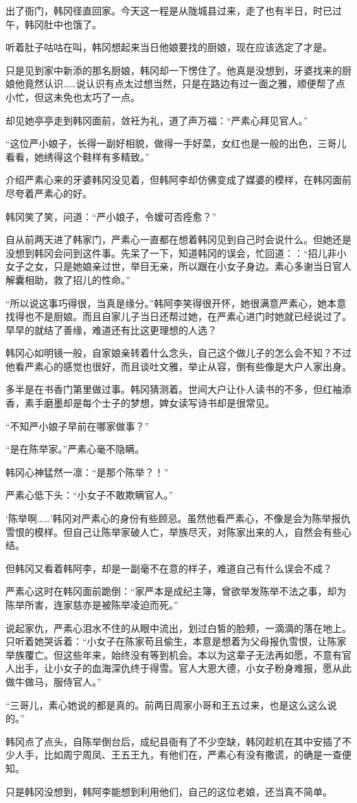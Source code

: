 出了衙门，韩冈径直回家。今天这一程是从陇城县过来，走了也有半日，时已过午，韩冈肚中也饿了。

听着肚子咕咕在叫，韩冈想起来当日他娘要找的厨娘，现在应该选定了才是。

只是见到家中新添的那名厨娘，韩冈却一下愣住了。他真是没想到，牙婆找来的厨娘他竟然认识……说认识有点太过想当然，只是在路边有过一面之雅，顺便帮了点小忙，但这未免也太巧了一点。

却见她亭亭走到韩冈面前，敛衽为礼，道了声万福：“严素心拜见官人。”

“这位严小娘子，长得一副好相貌，做得一手好菜，女红也是一般的出色，三哥儿看看，她绣得这个鞋样有多精致。”

介绍严素心来的牙婆韩冈没见着，但韩阿李却仿佛变成了媒婆的模样，在韩冈面前尽夸着严素心的好。

韩冈笑了笑，问道：“严小娘子，令嫒可否痊愈？”

自从前两天进了韩家门，严素心一直都在想着韩冈见到自己时会说什么。但她还是没想到韩冈会问到这件事。先呆了一下，知道韩冈的误会，忙回道：：“招儿非小女子之女，只是她娘亲过世，举目无亲，所以跟在小女子身边。素心多谢当日官人解囊相助，救了招儿的性命。”

“所以说这事巧得很，当真是缘分。”韩阿李笑得很开怀，她很满意严素心，她本意找得也不是厨娘。而且自家儿子当日还帮过她，在严素心进门时她就已经说过了。早早的就结了善缘，难道还有比这更理想的人选？

韩冈心如明镜一般，自家娘亲转着什么念头，自己这个做儿子的怎么会不知？不过他看严素心的感觉也很好，而且谈吐文雅，举止从容，倒有些像是大户人家出身。

多半是在书香门第里做过事。韩冈猜测着。世间大户让仆人读书的不多，但红袖添香，素手磨墨却是每个士子的梦想，婢女读写诗书却是很常见。

“不知严小娘子早前在哪家做事？”

“是在陈举家。”严素心毫不隐瞒。

韩冈心神猛然一凛：“是那个陈举？！”

严素心低下头：“小女子不敢欺瞒官人。”

‘陈举啊……’韩冈对严素心的身份有些顾忌。虽然他看严素心，不像是会为陈举报仇雪恨的模样。但自己让陈举家破人亡，举族尽灭，对陈家出来的人，自然会有些心结。

但韩冈又看着韩阿李，却是一副毫不在意的样子，难道自己有什么误会不成？

严素心这时在韩冈面前跪倒：“家严本是成纪主簿，曾欲举发陈举不法之事，却为陈举所害，连家慈亦是被陈举凌迫而死。”

说起家仇，严素心泪水不住的从眼中流出，划过白皙的脸颊，一滴滴的落在地上。只听着她哭诉着：“小女子在陈家苟且偷生，本意是想着为父母报仇雪恨，让陈家举族覆亡。但这些年来，始终没有等到机会。本以为这辈子无法再如愿，不意有官人出手，让小女子的血海深仇终于得雪。官人大恩大德，小女子粉身难报，愿从此做牛做马，服侍官人。”

“三哥儿，素心她说的都是真的。前两日周家小哥和王五过来，也是这么这么说的。”

韩冈点了点头，自陈举倒台后，成纪县衙有了不少空缺，韩冈趁机在其中安插了不少人手，比如周宁周凤、王五王九，有他们在，严素心有没有撒谎，的确是一查便知。

只是韩冈没想到，韩阿李能想到利用他们，自己的这位老娘，还当真不简单。

